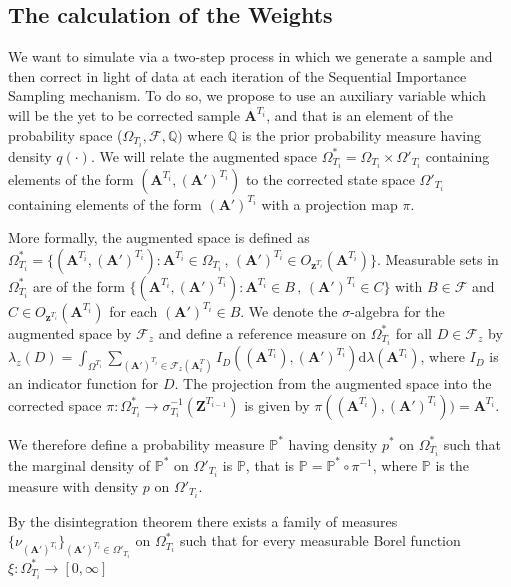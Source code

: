 \documentclass{article}
\newcommand{\D}{\mathrm{d}}
\renewcommand{\vec}[1]{\mathbf{#1}}
\begin{document}
\subsection{The calculation of the Weights} \label{subsec:weight}

We want to simulate via a two-step process in which we generate a sample and then correct in light of data at each iteration of the Sequential Importance Sampling mechanism. To do so, we propose to use an auxiliary variable which will be the yet to be corrected sample $\vec{A}^{T_i}$, and that is an element of the probability space ($\Omega_{T_i}, \mathcal{F}, \mathbb{Q})$ where $\mathbb{Q}$ is the prior probability measure having density $q(\cdot)$. We will relate the augmented space $\Omega^*_{T_i} = \Omega_{T_i} \times \Omega'_{T_i}$ containing elements of the form $(\vec{A}^{T_i}, (\vec{A}')^{T_i})$ to the corrected state space $\Omega'_{T_i}$ containing elements of the form  $(\vec{A}')^{T_i}$ with a projection map $\pi$. 

More formally, the augmented space is defined as $\Omega^*_{T_i} = \{ (\vec{A}^{T_i}, (\vec{A}')^{T_i}) : \vec{A}^{T_i} \in \Omega_{T_i} \, , \, (\vec{A}')^{T_i} \in O_{\vec{z}^{T_i}} (\vec{A}^{T_i}) \}$. Measurable sets in $\Omega^*_{T_i}$ are of the form $\{ (\vec{A}^{T_i}, (\vec{A}')^{T_i}) : \vec{A}^{T_i} \in B \, , \, (\vec{A}')^{T_i} \in C \}$ with $B \in \mathcal{F}$ and $C \in O_{\vec{z}^{T_i}} (\vec{A}^{T_i})$ for each $(\vec{A}')^{T_i} \in B$. We denote the $\sigma$-algebra for the augmented space by $\mathcal{F}_z$ and define a reference measure on $\Omega^*_{T_i}$ for all $D \in \mathcal{F}_z$ by $\lambda_z(D) = \int_{\Omega^{T_i}} \sum_{(\vec{A}')^{T_i} \in \mathcal{F}_z(\vec{A}^T_i)} I_D((\vec{A}^{T_i}), (\vec{A}')^{T_i}) \D \lambda(\vec{A}^{T_i})$, where $I_D$ is an indicator function for $D$. The projection from the augmented space into the corrected space $\pi : \Omega^*_{T_i} \rightarrow \sigma^{-1}_{T_i}(\vec{Z}^{T_{i-1}})$ is given by $\pi((\vec{A}^{T_i}), (\vec{A}')^{T_i})) = \vec{A}^{T_i}$. 

We therefore define a probability measure $\mathbb{P}^*$ having density $p^*$ on $\Omega^*_{T_i}$ such that the marginal density of $\mathbb{P}^*$ on $\Omega'_{T_i}$ is $\mathbb{P}$, that is $\mathbb{P} = \mathbb{P}^* \circ \pi^{-1}$, where $\mathbb{P}$ is the measure with density $p$ on $\Omega'_{T_i}$.

By the disintegration theorem there exists a family of measures $\{ \nu_{(\vec{A}')^{T_i}}\}_{(\vec{A}')^{T_i} \in \Omega'_{T_i}}$ on $\Omega^*_{T_i}$ such that for every measurable Borel function $ \xi : \Omega^*_{T_i} \rightarrow [0, \infty]$
\end{document}
